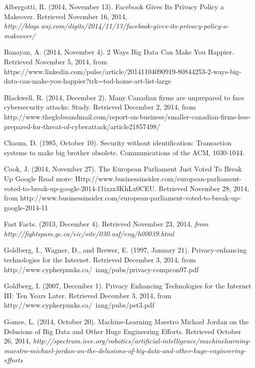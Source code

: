 \documentclass[12pt]{article}
\begin{document}
\clearpage
\singlespace
\begin{thebibliography}{99}
	Albergotti, R. (2014, November 13). Facebook Gives Its Privacy Policy a Makeover. Retrieved November 16, 2014, {\sl http://blogs.wsj.com/digits/2014/11/13/facebook-gives-its-privacy-policy-a-makeover/}

	Banayan, A. (2014, November 4). 2 Ways Big Data Can Make You Happier. Retrieved November 5, 2014, from https://www.linkedin.com/pulse/article/20141104090919-80844253-2-ways-big-data-can-make-you-happier?trk=tod-home-art-list-large

	Blackwell, R. (2014, December 2). Many Canadian firms are unprepared to face cybersecurity attacks: Study. Retrieved December 2, 2014, from http://www.theglobeandmail.com/report-on-business/smaller-canadian-firms-less-prepared-for-threat-of-cyberattack/article21857498/

	Chaum, D. (1985, October 10). Security without identification: Transaction systems to make big brother obsolete. Communications of the ACM, 1030-1044.

	Cook, J. (2014, November 27). The European Parliament Just Voted To Break Up Google Read more: Http://www.businessinsider.com/european-parliament-voted-to-break-up-google-2014-11ixzz3KhLx0CEU. Retrieved November 28, 2014, from http://www.businessinsider.com/european-parliament-voted-to-break-up-google-2014-11

	Fast Facts. (2013, December 4). Retrieved November 23, 2014, {\sl from http://fightspam.gc.ca/eic/site/030.nsf/eng/h\textunderscore00039.html}

	Goldberg, I., Wagner, D., and Brewer, E. (1997, January 21). Privacy-enhancing technologies for the Internet. Retrieved December 3, 2014, from http://www.cypherpunks.ca/~iang/pubs/privacy-compcon97.pdf

	Goldberg, I. (2007, December 1). Privacy Enhancing Technologies for the Internet III: Ten Years Later. Retrieved December 3, 2014, from http://www.cypherpunks.ca/~iang/pubs/pet3.pdf

	Gomes, L. (2014, October 20). Machine-Learning Maestro Michael Jordan on the Delusions of Big Data and Other Huge Engineering Efforts. Retrieved October 26, 2014, {\sl http://spectrum.ieee.org/robotics/artificial-intelligence/machinelearning-maestro-michael-jordan-on-the-delusions-of-big-data-and-other-huge-engineering-efforts}


\end{thebibliography}
\end{document}
